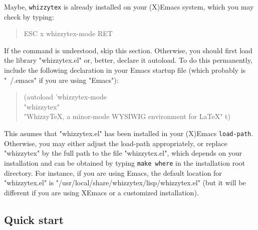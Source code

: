 \documentclass[12pt]{article}
\begin{document}
Maybe, {\tt whizzytex} is already installed on your (X)Emacs system, which
you may check by typing:
\begin{quote}
\begin{tt}
ESC x whizzytex-mode RET
\end{tt}
\end{quote}
If the command is understood, skip this section.
Otherwise, you should first load the library \lst"whizzytex.el" or, better,
declare it autoload. To do this permanently, include the following
declaration in your Emacs startup file (which probably is \lst"~/.emacs" if
you are using \lst"Emacs"):
\begin{quote}\small
\begin{tt}
(autoload 'whizzytex-mode \\ \indent\obeyspaces
    "whizzytex" \\ \indent\obeyspaces
    "WhizzyTeX, a minor-mode WYSIWIG environment for LaTeX" t)
\end{tt}
\end{quote}
This asumes that \lst"whizzytex.el" has been installed in your (X)Emacs
{\tt load-path}. Otherwise, you may either adjust the load-path
appropriately, or replace \lst"whizzytex" by the full path to the file
\lst"whizzytex.el", which depends on your installation and can be
obtained by typing {\tt make where} in the installation root directory.  For
instance, if you are using Emacs, the default location for
\lst"whizzytex.el" is
\lst"/usr/local/share/whizzytex/lisp/whizzytex.el" (but it will be different
if you are using XEmacs or a customized installation).


\subsection {Quick start} 
\end{document}
